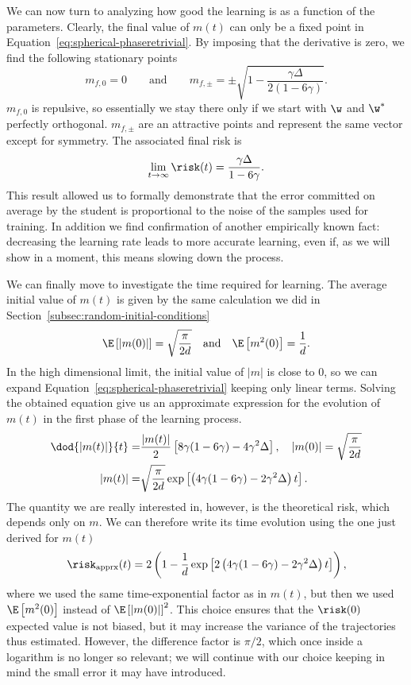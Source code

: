 We can now turn to analyzing how good the learning is as a function of the parameters.
Clearly, the final value of \(m{(t)}\) can only be a fixed point in Equation~\eqref{eq:spherical-phaseretrivial}.
By imposing that the derivative is zero, we find the following stationary points
\[m_{f,0} = 0 \qquad\text{and}\qquad m_{f,\pm} = \pm\sqrt{1-\frac{\gamma\Delta}{2(1-6\gamma)}}.\]
\(m_{f,0}\) is repulsive, so essentially we stay there only if we start with \(\w\) and \(\w^*\) perfectly orthogonal.
\(m_{f,\pm}\) are an attractive points and represent the same vector except for symmetry. The associated final risk is 
\[
  \lim_{t\to\infty}\risk(t) = \frac{\gamma\Delta}{1-6\gamma}.
\]
This result allowed us to formally demonstrate that the error committed on average by the student is proportional to the noise of the samples used for training.
In addition we find confirmation of another empirically known fact:
decreasing the learning rate leads to more accurate learning, even if, as we will show in a moment,
this means slowing down the process.

We can finally move to investigate the time required for learning. The average initial value of \(m{(t)}\) is given by
the same calculation we did in Section~\ref{subsec:random-initial-conditions}
\[
  \E\left[|m(0)|\right] = \sqrt{\frac{\pi}{2d}}\quad\text{and}\quad
  \E\left[m^2(0)\right] = \frac1d.
\]
In the high dimensional limit, the initial value of \(|m|\) is close to 0, so we can expand Equation~\eqref{eq:spherical-phaseretrivial} keeping only linear terms.
Solving the obtained equation give us an approximate expression for the evolution of \(m(t)\) in the first phase of the learning process.
\[\begin{split}
  \dod{|m{(t)}|}{t} =& \frac{|m{(t)}|}{2}\left[8\gamma(1-6\gamma)-4\gamma^2\Delta\right], \quad |m{(0)}| = \sqrt{\frac{\pi}{2d}} \\
  |m{(t)}| =& \sqrt{\frac{\pi}{2d}} \exp\left[\left(4\gamma(1-6\gamma)-2\gamma^2\Delta\right)t\right].
\end{split}\]
The quantity we are really interested in, however, is the theoretical risk, which depends only on \(m\).
We can therefore write its time evolution using the one just derived for \(m(t)\)
\[
  \risk_\text{apprx}{(t)} = 2\left(1-\frac1d \exp\left[2\left(4\gamma(1-6\gamma)-2\gamma^2\Delta\right)t\right]\right),
\]
where we used the same time-exponential factor as in \(m{(t)}\), but then we used \(\E\left[m^2(0)\right]\)
instead of \(\E\left[|m(0)|\right]^2\).
This choice ensures that the \(\risk(0)\) expected value is not biased,
but it may increase the variance of the trajectories thus estimated.
However, the difference factor is \(\pi/2\), which once inside a logarithm is no longer so relevant;
we will continue with our choice keeping in mind the small error it may have introduced.

